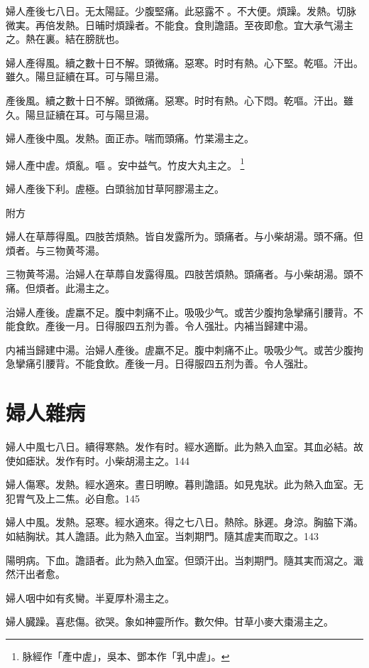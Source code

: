 {\khaaitp 婦人}產後七八日。无太陽証。少腹堅痛。此惡露不{\sungtpii 𥁞}。不大便。煩躁。发熱。切脉微実。再倍发熱。日晡时煩躁者。不{\khaaitp 能}食。食則譫語。至夜即愈。宜大承气湯主之。熱在裏。結在膀胱也。{\dengben}

婦人產得風。續之數十日不解。頭微痛。惡寒。时时有熱。心下堅。乾嘔。汗出。雖久。陽旦証續在耳。可与陽旦湯。{\wuben}

產後風。續之數十日不解。頭微痛。惡寒。时时有熱。心下悶。乾嘔。汗出。雖久。陽旦証續在耳。可与陽旦湯。{\dengben}

{\khaaitp 婦人}產後中風。发熱。面{\khaaitp 正}赤。喘而頭痛。竹枼湯主之。

婦人產中虗。煩亂。嘔{\sungtpii 𠱘}。安中益气。竹皮大丸主之。
	\footnote{脉經作「產中虗」，吳本、鄧本作「乳中虗」。}

{\khaaitp 婦人}產後下利。虗極。白頭翁加甘草阿膠湯主之。

附方

婦人在草蓐得風。四肢苦煩熱。皆自发露所为。頭痛者。与小柴胡湯。頭不痛。但煩者。与三物黄芩湯。{\wuben}

三物黄芩湯。治婦人在草蓐自发露得風。四肢苦煩熱。頭痛者。与小柴胡湯。頭不痛。但煩者。此湯主之。{\dengben}

治婦人產後。虗羸不足。腹中刺痛不止。吸吸少气。或苦少腹拘急攣痛引腰背。不能食飲。產後一月。日得服四五剂为善。令人强壯。内補当歸建中湯。{\wuben}

内補当歸建中湯。治婦人產後。虗羸不足。腹中刺痛不止。吸吸少气。或苦少腹拘急攣痛引腰背。不能食飲。產後一月。日得服四五剂为善。令人强壯。{\dengben}

\chapter{婦人雜病}

婦人中風七八日。續得寒熱。发作有时。經水適斷。此为熱入血室。其血必結。故使如瘧狀。发作有时。小柴胡湯主之。144

婦人傷寒。发熱。經水適來。晝日明瞭。暮則譫語。如見鬼狀。此为熱入血室。无犯胃气及上二焦。必自愈。145

婦人中風。发熱。惡寒。經水適來。得之七八日。熱除。脉遲。身涼。胸脇下滿。如結胸狀。其人譫語。此为熱入血室。当刺期門。隨其{\khaaitp 虗}実而取之。143

陽明病。下血。譫語者。此为熱入血室。但頭汗出。当刺期門。隨其実而瀉之。濈然汗出者愈。

婦人咽中如有炙臠。半夏厚朴湯主之。

婦人臓躁。喜悲傷。欲哭。象如神靈所作。數欠伸。甘草小麥大棗湯主之。

